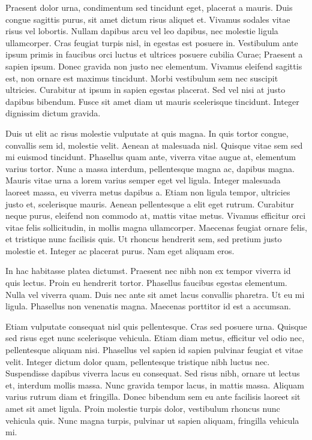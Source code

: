 \documentclass[8pt]{article}
\begin{document}
\begin{multicols}{2}
Praesent dolor urna, condimentum sed tincidunt eget, placerat a mauris. Duis congue sagittis purus, sit amet dictum risus aliquet et. Vivamus sodales vitae risus vel lobortis. Nullam dapibus arcu vel leo dapibus, nec molestie ligula ullamcorper. Cras feugiat turpis nisl, in egestas est posuere in. Vestibulum ante ipsum primis in faucibus orci luctus et ultrices posuere cubilia Curae; Praesent a sapien ipsum. Donec gravida non justo nec elementum. Vivamus eleifend sagittis est, non ornare est maximus tincidunt. Morbi vestibulum sem nec suscipit ultricies. Curabitur at ipsum in sapien egestas placerat. Sed vel nisi at justo dapibus bibendum. Fusce sit amet diam ut mauris scelerisque tincidunt. Integer dignissim dictum gravida.

Duis ut elit ac risus molestie vulputate at quis magna. In quis tortor congue, convallis sem id, molestie velit. Aenean at malesuada nisl. Quisque vitae sem sed mi euismod tincidunt. Phasellus quam ante, viverra vitae augue at, elementum varius tortor. Nunc a massa interdum, pellentesque magna ac, dapibus magna. Mauris vitae urna a lorem varius semper eget vel ligula. Integer malesuada laoreet massa, eu viverra metus dapibus a. Etiam non ligula tempor, ultricies justo et, scelerisque mauris. Aenean pellentesque a elit eget rutrum. Curabitur neque purus, eleifend non commodo at, mattis vitae metus. Vivamus efficitur orci vitae felis sollicitudin, in mollis magna ullamcorper. Maecenas feugiat ornare felis, et tristique nunc facilisis quis. Ut rhoncus hendrerit sem, sed pretium justo molestie et. Integer ac placerat purus. Nam eget aliquam eros.

In hac habitasse platea dictumst. Praesent nec nibh non ex tempor viverra id quis lectus. Proin eu hendrerit tortor. Phasellus faucibus egestas elementum. Nulla vel viverra quam. Duis nec ante sit amet lacus convallis pharetra. Ut eu mi ligula. Phasellus non venenatis magna. Maecenas porttitor id est a accumsan.

Etiam vulputate consequat nisl quis pellentesque. Cras sed posuere urna. Quisque sed risus eget nunc scelerisque vehicula. Etiam diam metus, efficitur vel odio nec, pellentesque aliquam nisi. Phasellus vel sapien id sapien pulvinar feugiat et vitae velit. Integer dictum dolor quam, pellentesque tristique nibh luctus nec. Suspendisse dapibus viverra lacus eu consequat. Sed risus nibh, ornare ut lectus et, interdum mollis massa. Nunc gravida tempor lacus, in mattis massa. Aliquam varius rutrum diam et fringilla. Donec bibendum sem eu ante facilisis laoreet sit amet sit amet ligula. Proin molestie turpis dolor, vestibulum rhoncus nunc vehicula quis. Nunc magna turpis, pulvinar ut sapien aliquam, fringilla vehicula mi. 


\end{multicols}
\end{document}
